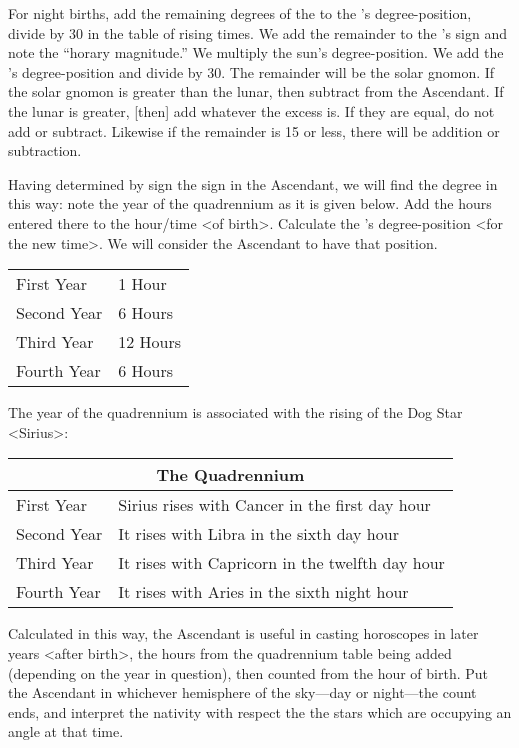 For night births, add the remaining degrees of the \Moon\xspace to the \Sun’s degree-position, divide by 30 in the table of rising times. We add the remainder to the \Sun’s sign and note the “horary magnitude.” We multiply the sun’s degree-position. We add the \Sun’s degree-position and divide by 30. The remainder will be the solar gnomon. If the solar gnomon is greater than the lunar, then subtract from the Ascendant.
If the lunar is greater, [then] add whatever the excess is. If they are equal, do not add or subtract. Likewise if the remainder is 15 or less, there will be addition or subtraction.

Having determined by sign the sign in the Ascendant, we will find the degree in this way: note the year of the quadrennium as it is given below. Add the hours entered there to the hour/time <of birth>. Calculate the \Moon’s degree-position <for the new time>. We will consider the Ascendant to have that position.

\renewcommand{\arraystretch}{1.2}
\begin{table}[h!]
\begin{center}
\begin{tabular}{| p{.3\linewidth} | p{.3\linewidth} |}
\hline
First Year & 1 Hour \\
Second Year & 6 Hours \\
Third Year & 12 Hours \\
Fourth Year & 6 Hours \\
\hline
\end{tabular}
\end{center}
\end{table}

The year of the quadrennium is associated with the rising of the Dog Star <Sirius>:

\begin{table}
\begin{center}
\begin{tabularx}{\textwidth}	{| l | X |}
\hline
\multicolumn{2}{|c|}{The Quadrennium} \\
\hline
First Year
	& Sirius rises with Cancer in the first day hour \\
Second Year 
	& It rises with Libra in the sixth day hour \\
Third Year 
	& It rises with Capricorn in the twelfth day hour \\
Fourth Year 
	& It rises with Aries in the sixth night hour \\
\hline	
\end{tabularx}
\end{center}
\end{table}
\mnt[0.2cm]
Calculated in this way, the Ascendant is useful in casting horoscopes in later years <after birth>, the hours from the quadrennium table being added (depending on the year in question), then counted from the hour of birth. Put the Ascendant in whichever hemisphere of the sky—day or night—the count ends, and interpret the nativity with respect the the stars which are occupying an angle at that time.

\newpage